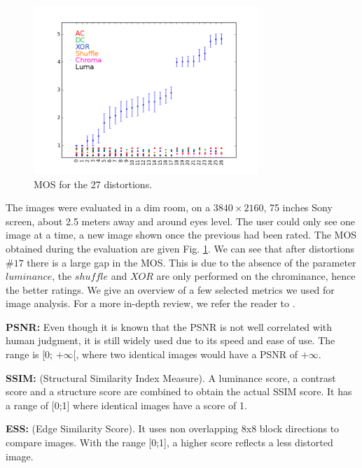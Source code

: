 \documentclass{article}
\begin{document}
\begin{figure}[H]
  \centering
  \includegraphics[width=8.5cm]{figures/mos_params}
  \vspace{-5mm}
  \caption{MOS for the 27 distortions.\label{fig:mos} }
\end{figure}


The images were evaluated in a dim room, on a $3840\times 2160$, 75 inches Sony screen, about 2.5 meters away and around eyes level. The user could only see one image at a time, a new image shown once the previous had been rated.
The MOS obtained during the evaluation are given Fig. \ref{fig:mos}. %
We can see that after distortions $\#17$ there is a large gap in the MOS. This is due to the absence of the parameter $luminance$, the $shuffle$ and $XOR$ are only performed on the chrominance, hence the better ratings.
We give an overview of a few selected metrics we used for image analysis. For a more in-depth review, we refer the reader to \cite{hofbauer2016identifying}.

\textbf{PSNR:} Even though it is known that the PSNR is not well correlated with human judgment, it is still widely used due to its speed and ease of use. The range is [0; $+\infty$[, where two identical images would have a PSNR of $+\infty$.

\textbf{SSIM\cite{wang2004image}:} (Structural Similarity Index Measure). A luminance score, a contrast score and a structure score are combined to obtain the actual SSIM score. It has a range of [0;1] where identical images have a score of 1.

\textbf{ESS\cite{mao2004security}:} (Edge Similarity Score). It uses non overlapping 8x8 block directions to compare images. With the range [0;1], a higher score reflects a less distorted image.
\end{document}
